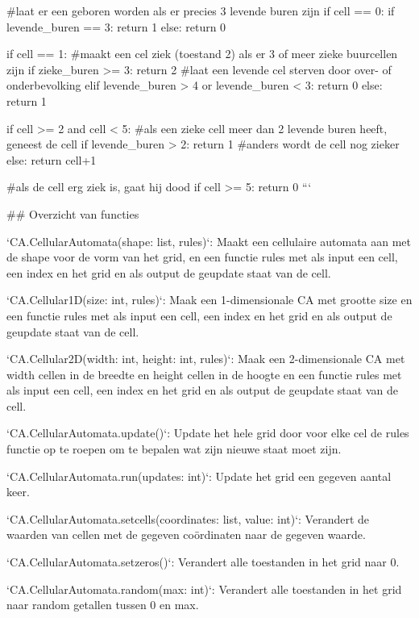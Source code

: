 \documentclass{article}
\begin{document}
\begin{markdown}
    #laat er een geboren worden als er precies 3 levende buren zijn      
    if cell == 0:
        if levende_buren == 3:
            return 1
        else:
            return 0


    if cell == 1:
        #maakt een cel ziek (toestand 2) als er 3 of meer zieke buurcellen zijn
        if zieke_buren >= 3:
            return 2
        #laat een levende cel sterven door over- of onderbevolking
        elif levende_buren > 4 or levende_buren < 3: 
            return 0
        else:
            return 1


    if cell >= 2 and cell < 5:
        #als een zieke cell meer dan 2 levende buren heeft, geneest de cell
        if levende_buren > 2:
            return 1
        #anders wordt de cell nog zieker
        else: 
            return cell+1
    
    #als de cell erg ziek is, gaat hij dood
    if cell >= 5:
        return 0
```

## Overzicht van functies

`CA.CellularAutomata(shape: list, rules)`: Maakt een cellulaire automata aan met de shape voor de vorm van het grid, en een functie rules met als input een cell, een index en het grid en als output de geupdate staat van de cell.

`CA.Cellular1D(size: int, rules)`: Maak een 1-dimensionale CA met grootte size en een functie rules met als input een cell, een index en het grid en als output de geupdate staat van de cell.

`CA.Cellular2D(width: int, height: int, rules)`: Maak een 2-dimensionale CA met width cellen in de breedte en height cellen in de hoogte en een functie rules met als input een cell, een index en het grid en als output de geupdate staat van de cell.

`CA.CellularAutomata.update()`: Update het hele grid door voor elke cel de rules functie op te roepen om te bepalen wat zijn nieuwe staat moet zijn.

`CA.CellularAutomata.run(updates: int)`: Update het grid een gegeven aantal keer.

`CA.CellularAutomata.setcells(coordinates: list, value: int)`: Verandert de waarden van cellen met de gegeven coördinaten naar de gegeven waarde.

`CA.CellularAutomata.setzeros()`: Verandert alle toestanden in het grid naar 0.

`CA.CellularAutomata.random(max: int)`: Verandert alle toestanden in het grid naar random getallen tussen 0 en max.


\end{markdown}
\end{document}
